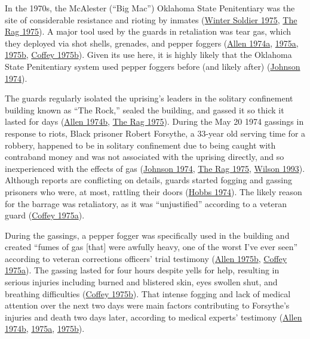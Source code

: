 \documentclass[
  11pt,
]{krantz}
\begin{document}
In the 1970s, the McAlester (``Big Mac'') Oklahoma State Penitentiary was the site of considerable resistance and rioting by inmates (\protect\hyperlink{ref-WinterSoldier1975}{Winter Soldier 1975}, \protect\hyperlink{ref-TheRag1975}{The Rag 1975}).
A major tool used by the guards in retaliation was tear gas, which they deployed via shot shells, grenades, and pepper foggers (\protect\hyperlink{ref-Allen1974a}{Allen 1974a}, \protect\hyperlink{ref-Allen1975a}{1975a}, \protect\hyperlink{ref-Allen1975b}{1975b}, \protect\hyperlink{ref-Coffey1975b}{Coffey 1975b}).
Given its use here, it is highly likely that the Oklahoma State Penitentiary system used pepper foggers before (and likely after) (\protect\hyperlink{ref-Johnson1974}{Johnson 1974}).

The guards regularly isolated the uprising's leaders in the solitary confinement building known as ``The Rock,'' sealed the building, and gassed it so thick it lasted for days (\protect\hyperlink{ref-Allen1974b}{Allen 1974b}, \protect\hyperlink{ref-TheRag1975}{The Rag 1975}).
During the May 20 1974 gassings in response to riots, Black prisoner Robert Forsythe, a 33-year old serving time for a robbery, happened to be in solitary confinement due to being caught with contraband money and was not associated with the uprising directly, and so inexperienced with the effects of gas (\protect\hyperlink{ref-Johnson1974}{Johnson 1974}, \protect\hyperlink{ref-TheRag1975}{The Rag 1975}, \protect\hyperlink{ref-Wilson1993}{Wilson 1993}).
Although reports are conflicting on details, guards started fogging and gassing prisoners who were, at most, rattling their doors (\protect\hyperlink{ref-Hobbs1974}{Hobbs 1974}).
The likely reason for the barrage was retaliatory, as it was ``unjustified'' according to a veteran guard (\protect\hyperlink{ref-Coffey1975a}{Coffey 1975a}).

During the gassings, a pepper fogger was specifically used in the building and created ``fumes of gas {[}that{]} were awfully heavy, one of the worst I've ever seen'' according to veteran corrections officers' trial testimony (\protect\hyperlink{ref-Allen1975b}{Allen 1975b}, \protect\hyperlink{ref-Coffey1975a}{Coffey 1975a}).
The gassing lasted for four hours despite yells for help, resulting in serious injuries including burned and blistered skin, eyes swollen shut, and breathing difficulties (\protect\hyperlink{ref-Coffey1975b}{Coffey 1975b}).
That intense fogging and lack of medical attention over the next two days were main factors contributing to Forsythe's injuries and death two days later, according to medical experts' testimony (\protect\hyperlink{ref-Allen1974b}{Allen 1974b}, \protect\hyperlink{ref-Allen1975a}{1975a}, \protect\hyperlink{ref-Allen1975b}{1975b}).
\end{document}
